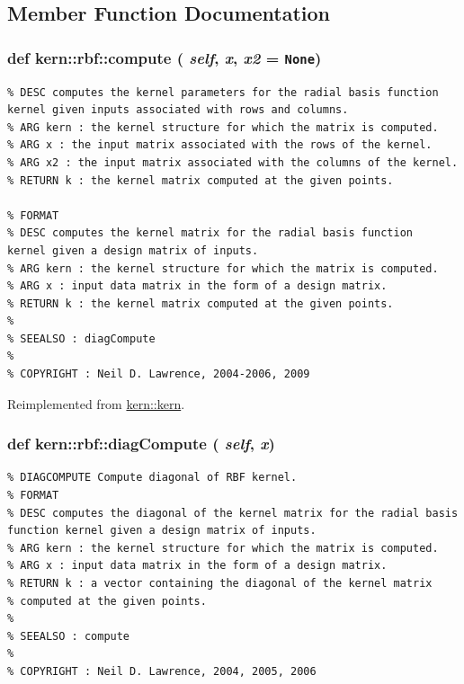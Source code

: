 \subsection{Member Function Documentation}
\hypertarget{classkern_1_1rbf_be3823a7db917ca61725cb5083b0622b}{
\subsubsection[{compute}]{\setlength{\rightskip}{0pt plus 5cm}def kern::rbf::compute ( {\em self}, \/   {\em x}, \/   {\em x2} = {\tt None})}}
\label{classkern_1_1rbf_be3823a7db917ca61725cb5083b0622b}




\footnotesize\begin{verbatim}% DESC computes the kernel parameters for the radial basis function
kernel given inputs associated with rows and columns.
% ARG kern : the kernel structure for which the matrix is computed.
% ARG x : the input matrix associated with the rows of the kernel.
% ARG x2 : the input matrix associated with the columns of the kernel.
% RETURN k : the kernel matrix computed at the given points.
 
% FORMAT
% DESC computes the kernel matrix for the radial basis function
kernel given a design matrix of inputs.
% ARG kern : the kernel structure for which the matrix is computed.
% ARG x : input data matrix in the form of a design matrix.
% RETURN k : the kernel matrix computed at the given points.
%
% SEEALSO : diagCompute
%
% COPYRIGHT : Neil D. Lawrence, 2004-2006, 2009

\end{verbatim}
\normalsize
 

Reimplemented from \hyperlink{classkern_1_1kern}{kern::kern}.\hypertarget{classkern_1_1rbf_5c3835b3bc757a209995a697670c972f}{
\subsubsection[{diagCompute}]{\setlength{\rightskip}{0pt plus 5cm}def kern::rbf::diagCompute ( {\em self}, \/   {\em x})}}
\label{classkern_1_1rbf_5c3835b3bc757a209995a697670c972f}




\footnotesize\begin{verbatim}% DIAGCOMPUTE Compute diagonal of RBF kernel.
% FORMAT
% DESC computes the diagonal of the kernel matrix for the radial basis function kernel given a design matrix of inputs.
% ARG kern : the kernel structure for which the matrix is computed.
% ARG x : input data matrix in the form of a design matrix.
% RETURN k : a vector containing the diagonal of the kernel matrix
% computed at the given points.
%
% SEEALSO : compute
%
% COPYRIGHT : Neil D. Lawrence, 2004, 2005, 2006

\end{verbatim}
\normalsize
 

